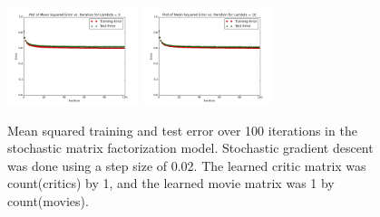 \documentclass[12pt]{article}
\newcommand{\plotwidth}{0.34}
\begin{document}
\begin{figure}[H]
	\includegraphics[width=\plotwidth\textwidth]{plots/test-i100d1l3.png}
	\includegraphics[width=\plotwidth\textwidth]{plots/test-i100d1l10.png}
	\caption{Mean squared training and test error over 100 iterations in the stochastic matrix factorization model. Stochastic gradient descent was done using a step size of 0.02. The learned critic matrix was count(critics) by 1, and the learned movie matrix was 1 by count(movies).}
	\label{fig:1}
	\end{figure}
\end{document}

